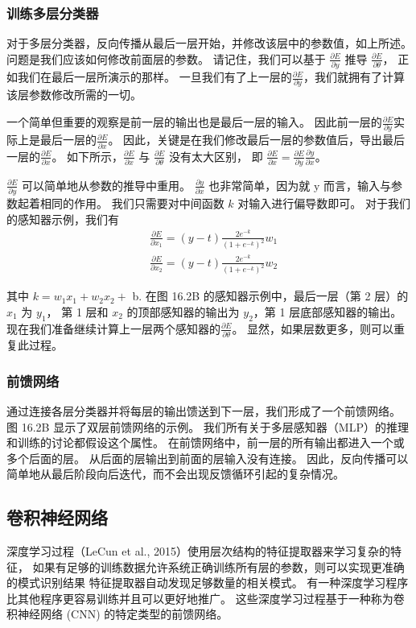 \subsubsection{训练多层分类器}
对于多层分类器，反向传播从最后一层开始，并修改该层中的参数值，如上所述。 问题是我们应该如何修改前面层的参数。 
请记住，我们可以基于 $\frac{\partial E}{\partial y}$ 推导 $\frac{\partial E}{\partial \theta}$，
正如我们在最后一层所演示的那样。 
一旦我们有了上一层的$\frac{\partial E}{\partial y}$，我们就拥有了计算该层参数修改所需的一切。

一个简单但重要的观察是前一层的输出也是最后一层的输入。 
因此前一层的$\frac{\partial E}{\partial y}$实际上是最后一层的$\frac{\partial E}{\partial x}$。 
因此，关键是在我们修改最后一层的参数值后，导出最后一层的$\frac{\partial E}{\partial x}$。 
如下所示，$\frac{\partial E}{\partial x}$ 与 $\frac{\partial E}{\partial \theta}$ 没有太大区别，
即 $\frac{\partial E}{\partial x}=\frac{\partial E}{\partial y}\frac{\partial y}{\partial x}$。

$\frac{\partial E}{\partial y}$ 可以简单地从参数的推导中重用。 
$\frac{\partial y}{\partial x}$ 也非常简单，因为就 $\mathrm{y}$ 而言，输入与参数起着相同的作用。 
我们只需要对中间函数 $k$ 对输入进行偏导数即可。 对于我们的感知器示例，我们有
$$
\begin{aligned}
& \frac{\partial E}{\partial x_{1}}=(y-t) \frac{2 e^{-k}}{\left(1+e^{-k}\right)^{2} } w_{1} \\
& \frac{\partial E}{\partial x_{2}}=(y-t) \frac{2 e^{-k}}{\left(1+e^{-k}\right)^{2} } w_{2}
\end{aligned}
$$

其中 $k=w_{1} x_{1}+w_{2} x_{2}+$ b. 在图 16.2B 的感知器示例中，最后一层（第 2 层）的 $x_{1}$ 为 $y_{1}$，
第 1 层和 $x_{2}$ 的顶部感知器的输出为 $y_ {2}$，第 1 层底部感知器的输出。 
现在我们准备继续计算上一层两个感知器的$\frac{\partial E}{\partial \theta}$。 显然，如果层数更多，则可以重复此过程。

\subsubsection{前馈网络}
通过连接各层分类器并将每层的输出馈送到下一层，我们形成了一个前馈网络。 图 16.2B 显示了双层前馈网络的示例。 
我们所有关于多层感知器（MLP）的推理和训练的讨论都假设这个属性。 在前馈网络中，前一层的所有输出都进入一个或多个后面的层。 
从后面的层输出到前面的层输入没有连接。 因此，反向传播可以简单地从最后阶段向后迭代，而不会出现反馈循环引起的复杂情况。

\subsection{卷积神经网络}
深度学习过程（LeCun et al., 2015）使用层次结构的特征提取器来学习复杂的特征，
如果有足够的训练数据允许系统正确训练所有层的参数，则可以实现更准确的模式识别结果 特征提取器自动发现足够数量的相关模式。 
有一种深度学习程序比其他程序更容易训练并且可以更好地推广。 
这些深度学习过程基于一种称为卷积神经网络 (CNN) 的特定类型的前馈网络。

